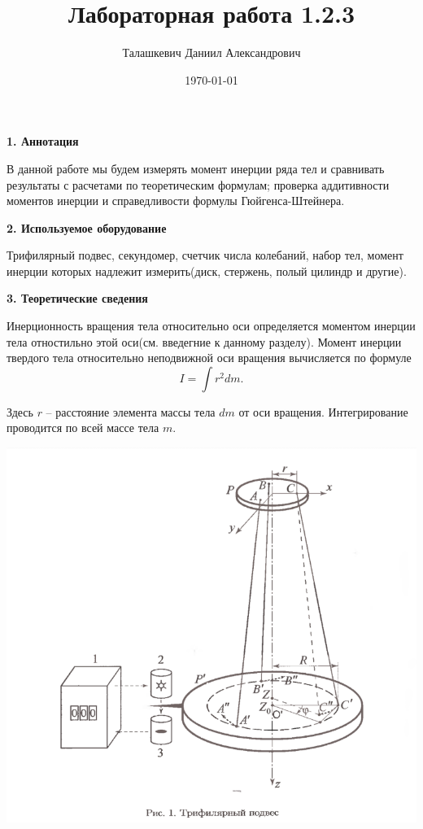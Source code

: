 \documentclass[a4paper,12pt]{article} %
\author{Талашкевич Даниил Александрович}
\title{Лабораторная работа 1.2.3}
\date{\today}
\begin{document}
\maketitle
\thispagestyle{empty}

\newpage
\setcounter{page}{1}


{\bf 1. Аннотация}

В данной работе мы будем измерять момент инерции ряда тел и сравнивать результаты с расчетами по теоретическим формулам; проверка аддитивности моментов инерции и справедливости формулы Гюйгенса-Штейнера.

{\bf 2. Используемое оборудование}

Трифилярный подвес, секундомер, счетчик числа колебаний, набор тел, момент инерции которых надлежит измерить(диск, стержень, полый цилиндр и другие).

{\bf 3. Теоретические сведения}

Инерционность вращения тела относительно оси определяется моментом инерции тела отностильно этой оси(см. введегние к данному разделу). Момент инерции твердого тела относительно неподвижной оси вращения вычисляется по формуле 
\[ I = \int r^2 dm .\]

Здесь $r$ -- расстояние элемента массы тела $dm$ от оси вращения. Интегрирование проводится по всей массе тела $m$. 

\begin{center}
\includegraphics[scale=0.6]{1.2.3 1}
\end{center}
\end{document}
